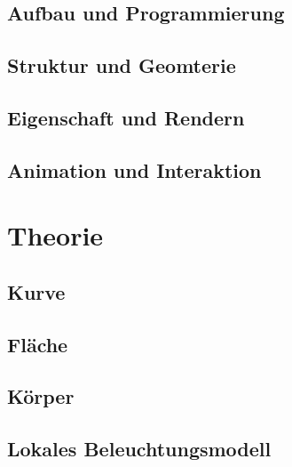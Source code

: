 \documentclass{scrreprt}
\begin{document}
\chapter{Aufbau und Programmierung}


\chapter{Struktur und Geomterie}


\chapter{Eigenschaft und Rendern}


\chapter{Animation und Interaktion}


\part{Theorie}
\chapter{Kurve}


\chapter{Fläche}


\chapter{Körper}


\chapter{Lokales Beleuchtungsmodell}





\end{document}
